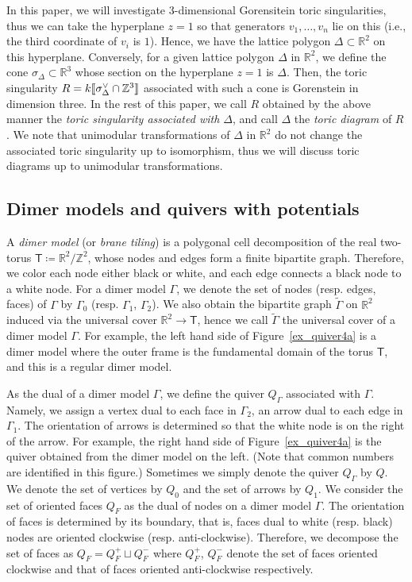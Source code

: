 \documentclass[ALCO,ThmDefs,Unicode]{cedram}
\newcommand{\ZZ}{\mathbb{Z}}
\newcommand{\RR}{\mathbb{R}}
\newcommand{\sfT}{\mathsf{T}}
\newcommand{\llbracket}{\mathopen{[\mkern -2.7mu[}}
\newcommand{\rrbracket}{\mathclose{]\mkern -2.7mu]}}
\begin{document}
In this paper, we will investigate $3$-dimensional Gorensitein toric singularities, thus we can take the hyperplane $z=1$ so that generators $v_1,\dots,v_n$ lie on this (i.e., the third coordinate of $v_i$ is $1$). Hence, we have the lattice polygon $\Delta\subset\RR^2$ on this hyperplane. Conversely, for a given lattice polygon $\Delta$ in $\RR^2$, we define the cone $\sigma_\Delta\subset\RR^3$ whose section on the hyperplane $z=1$ is $\Delta$. Then, the toric singularity $R=k\llbracket \sigma_\Delta^\vee\cap\ZZ^3\rrbracket $ associated with such a cone is Gorenstein in dimension three. In the rest of this paper, we call $R$ obtained by the above manner the \emph{toric singularity associated with $\Delta$}, and call $\Delta$ the \emph{toric diagram} of $R$. We note that unimodular transformations of $\Delta$ in $\RR^2$ do not change the associated toric singularity up to isomorphism, thus we will discuss toric diagrams up to unimodular transformations.



\subsection{Dimer models and quivers with potentials}\label{subsec_dimer}

A \emph{dimer model} (or \emph{brane tiling}) is a polygonal cell decomposition of the real two-torus $\sfT\coloneqq\RR^2/\ZZ^2$, whose nodes and edges form a finite bipartite graph. Therefore, we color each node either black or white, and each edge connects a black node to a white node. For a dimer model $\Gamma$, we denote the set of nodes (resp. edges, faces) of $\Gamma$ by $\Gamma_0$ (resp. $\Gamma_1$, $\Gamma_2$). We also obtain the bipartite graph $\widetilde{\Gamma}$ on $\RR^2$ induced via the universal cover $\RR^2\rightarrow\sfT$, hence we call $\widetilde{\Gamma}$ the universal cover of a dimer model $\Gamma$. For example, the left hand side of Figure~\ref{ex_quiver4a} is a dimer model where the outer frame is the fundamental domain of the torus $\sfT$, and this is a regular dimer model.

As the dual of a dimer model $\Gamma$, we define the quiver $Q_\Gamma$ associated with $\Gamma$. Namely, we assign a vertex dual to each face in $\Gamma_2$, an arrow dual to each edge in $\Gamma_1$. The orientation of arrows is determined so that the white node is on the right of the arrow. For example, the right hand side of Figure~\ref{ex_quiver4a} is the quiver obtained from the dimer model on the left. (Note that common numbers are identified in this figure.) Sometimes we simply denote the quiver $Q_\Gamma$ by $Q$. We denote the set of vertices by $Q_0$ and the set of arrows by $Q_1$. We consider the set of oriented faces $Q_F$ as the dual of nodes on a dimer model $\Gamma$. The orientation of faces is determined by its boundary, that is, faces dual to white (resp. black) nodes are oriented clockwise (resp. anti-clockwise). Therefore, we decompose the set of faces as $Q_F=Q^+_F\sqcup Q^-_F$ where $Q^+_F$, $Q^-_F$ denote the set of faces oriented clockwise and that of faces oriented anti-clockwise respectively.
\end{document}
